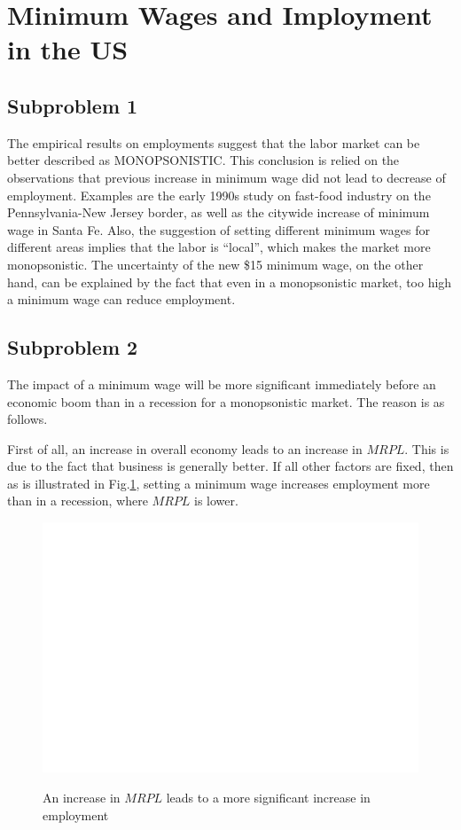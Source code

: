 \documentclass{article}
\begin{document}
\section{Minimum Wages and Imployment in the US}
\subsection{Subproblem 1}
The empirical results on employments suggest that the labor market can be better described as MONOPSONISTIC. This conclusion is relied on the observations that previous increase in minimum wage did not lead to decrease of employment. Examples are the early 1990s study on fast-food industry on the Pennsylvania-New Jersey border, as well as the citywide increase of minimum wage in Santa Fe. Also, the suggestion of setting different minimum wages for different areas implies that the labor is ``local'', which makes the market more monopsonistic. The uncertainty of the new \$15 minimum wage, on the other hand, can be explained by the fact that even in a monopsonistic market, too high a minimum wage can reduce employment.

\subsection{Subproblem 2}
The impact of a minimum wage will be more significant immediately before an economic boom than in a recession for a monopsonistic market. The reason is as follows.

First of all, an increase in overall economy leads to an increase in $MRPL$. This is due to the fact that business is generally better. If all other factors are fixed, then as is illustrated in Fig.\ref{CK_MRPL}, setting a minimum wage increases employment more than in a recession, where $MRPL$ is lower.
\begin{figure}[!htbp]
	\centering
	\includegraphics[width=12cm]{blank.png}\\
	\caption{An increase in $MRPL$ leads to a more significant increase in employment}\label{CK_MRPL}
\end{figure}
\end{document}

